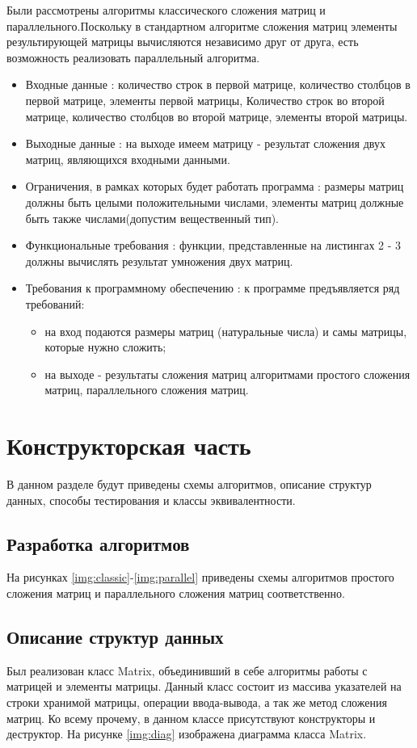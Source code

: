 Были рассмотрены алгоритмы классического сложения матриц и параллельного.Поскольку в стандартном алгоритме сложения матриц элементы результирующей матрицы вычисляются независимо друг от друга, есть возможность  реализовать параллельный  алгоритма.
\begin{itemize}
	\item Входные данные : количество строк в первой матрице, количество столбцов в первой матрице, элементы первой матрицы, Количество строк во второй матрице, количество столбцов во второй матрице, элементы второй матрицы.
	\item Выходные данные : на выходе имеем матрицу - результат сложения двух матриц, являющихся входными данными.
	\item Ограничения, в рамках которых будет работать программа : размеры матриц должны быть целыми положительными числами, элементы матриц должные быть также числами(допустим вещественный тип).
	\item Функциональные требования : функции, представленные на листингах 2 - 3 должны вычислять результат умножения двух матриц.
	\item Требования к программному обеспечению : к программе предъявляется ряд требований:
			\begin{itemize}
			    \item на вход подаются размеры матриц (натуральные числа) и самы матрицы, которые нужно сложить;
			    \item на выходе - результаты сложения матриц алгоритмами простого сложения матриц, параллельного сложения матриц.
			\end{itemize}
\end{itemize}

\section{Конструкторская часть}
В данном разделе будут приведены схемы  алгоритмов, описание структур данных, способы тестирования и классы эквивалентности.

\subsection{Разработка алгоритмов}

На рисунках \ref{img:classic}-\ref{img:parallel} приведены схемы алгоритмов простого сложения матриц и параллельного сложения матриц соответственно.

\subsection{Описание структур данных}
Был реализован класс Matrix, объединивший в себе алгоритмы работы с матрицей и элементы матрицы. Данный класс состоит из массива указателей на строки хранимой матрицы, операции ввода-вывода, а так же метод сложения матриц. Ко всему прочему, в данном классе присутствуют конструкторы и деструктор. На рисунке \ref{img:diag} изображена диаграмма класса Matrix.


